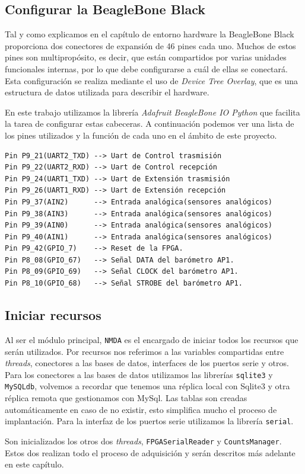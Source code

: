 	\subsection{Configurar la BeagleBone Black}
		Tal y como explicamos en el capítulo de entorno hardware la BeagleBone Black proporciona dos conectores de expansión de 46 pines cada
		uno\cite{BeagleWikiExp}. Muchos de estos pines son multipropósito, es decir, que están compartidos por varias unidades funcionales
		internas, por lo que debe configurarse a cuál de ellas se conectará. Esta configuración se realiza mediante el uso de \emph{Device
		Tree Overlay}, que es una estructura de datos utilizada para describir el hardware.
		\par
		En este trabajo utilizamos la librería \emph{Adafruit BeagleBone IO Python}\cite{AdaFruitGit} que facilita la tarea de configurar
		estas cabeceras. A continuación podemos ver una lista de los pines utilizados y la función de cada uno en el ámbito de este proyecto.
		\begin{lstlisting}[style=myBash]
Pin P9_21(UART2_TXD) --> Uart de Control trasmisión
Pin P9_22(UART2_RXD) --> Uart de Control recepción
Pin P9_24(UART1_TXD) --> Uart de Extensión trasmisión
Pin P9_26(UART1_RXD) --> Uart de Extensión recepción
Pin P9_37(AIN2)	     --> Entrada analógica(sensores analógicos)
Pin P9_38(AIN3)	     --> Entrada analógica(sensores analógicos)
Pin P9_39(AIN0)	     --> Entrada analógica(sensores analógicos)
Pin P9_40(AIN1)	     --> Entrada analógica(sensores analógicos)
Pin P9_42(GPIO_7)    --> Reset de la FPGA.
Pin P8_08(GPIO_67)   --> Señal DATA del barómetro AP1.
Pin P8_09(GPIO_69)   --> Señal CLOCK del barómetro AP1.
Pin P8_10(GPIO_68)   --> Señal STROBE del barómetro AP1.
		\end{lstlisting}

	\subsection{Iniciar recursos}
		Al ser el módulo principal, \texttt{NMDA} es el encargado de iniciar todos los recursos que serán utilizados. Por recursos nos
		referimos a las variables compartidas entre \emph{threads}, conectores a las bases de datos, interfaces de los puertos serie y otros.
		Para los conectores a las bases de datos utilizamos las librerías \texttt{sqlite3} y \texttt{MySQLdb}, volvemos a recordar que tenemos
		una réplica local con Sqlite3 y otra réplica remota que gestionamos con MySql. Las tablas son creadas automáticamente en caso de no
		existir, esto simplifica mucho el proceso de implantación. Para la interfaz de los puertos serie utilizamos la librería
		\texttt{serial}.
		\par
		Son inicializados los otros dos \emph{threads}, \texttt{FPGASerialReader} y \texttt{CountsManager}. Estos dos realizan todo el proceso
		de adquisición y serán descritos más adelante en este capítulo. 

